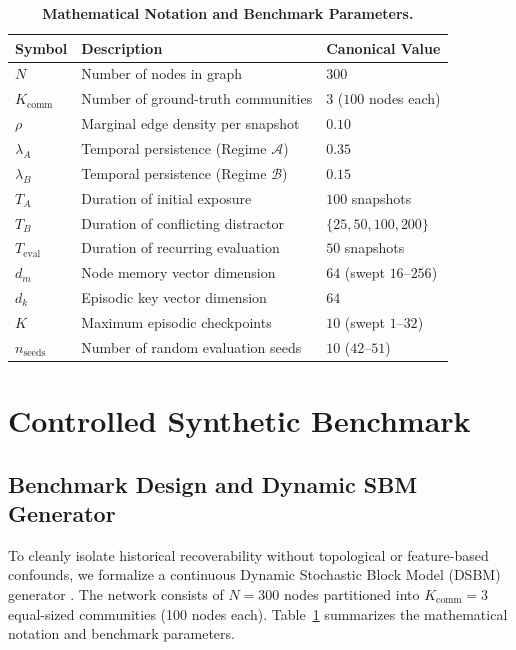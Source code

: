 \documentclass[10pt,twocolumn,letterpaper]{article}
\begin{document}
\begin{table}[!htbp]
\centering
\small
\caption{\textbf{Mathematical Notation and Benchmark Parameters.}}
\label{tab:notation_parameters}
\begin{tabularx}{\columnwidth}{lXl}
\toprule
\textbf{Symbol} & \textbf{Description} & \textbf{Canonical Value} \\
\midrule
$N$ & Number of nodes in graph & $300$ \\
$K_{\text{comm}}$ & Number of ground-truth communities & $3$ ($100$ nodes each) \\
$\rho$ & Marginal edge density per snapshot & $0.10$ \\
$\lambda_A$ & Temporal persistence (Regime $\mathcal{A}$) & $0.35$ \\
$\lambda_B$ & Temporal persistence (Regime $\mathcal{B}$) & $0.15$ \\
$T_A$ & Duration of initial exposure & $100$ snapshots \\
$T_B$ & Duration of conflicting distractor & $\{25, 50, 100, 200\}$ \\
$T_{\text{eval}}$ & Duration of recurring evaluation & $50$ snapshots \\
$d_m$ & Node memory vector dimension & $64$ (swept $16$--$256$) \\
$d_k$ & Episodic key vector dimension & $64$ \\
$K$ & Maximum episodic checkpoints & $10$ (swept $1$--$32$) \\
$n_{\text{seeds}}$ & Number of random evaluation seeds & $10$ ($42$--$51$) \\
\bottomrule
\end{tabularx}
\end{table}

\section{Controlled Synthetic Benchmark}
\label{sec:synthetic_benchmark}

\subsection{Benchmark Design and Dynamic SBM Generator}
To cleanly isolate historical recoverability without topological or feature-based confounds, we formalize a continuous Dynamic Stochastic Block Model (DSBM) generator \citep{holland1983stochastic}. The network consists of $N = 300$ nodes partitioned into $K_{\text{comm}} = 3$ equal-sized communities (100 nodes each). Table~\ref{tab:notation_parameters} summarizes the mathematical notation and benchmark parameters.
\end{document}
